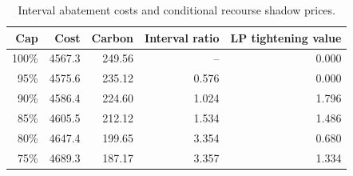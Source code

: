 \begin{table}[H]
\centering\small
\caption{Interval abatement costs and conditional recourse shadow prices.}\label{tab:duals}
\begin{tabular}{@{}rrrrr@{}}
\toprule
Cap & Cost & Carbon & Interval ratio & LP tightening value \\
\midrule
100\% & 4567.3 & 249.56 & -- & 0.000 \\
95\% & 4575.6 & 235.12 & 0.576 & 0.000 \\
90\% & 4586.4 & 224.60 & 1.024 & 1.796 \\
85\% & 4605.5 & 212.12 & 1.534 & 1.486 \\
80\% & 4647.4 & 199.65 & 3.354 & 0.680 \\
75\% & 4689.3 & 187.17 & 3.357 & 1.334 \\
\bottomrule
\end{tabular}
\end{table}
